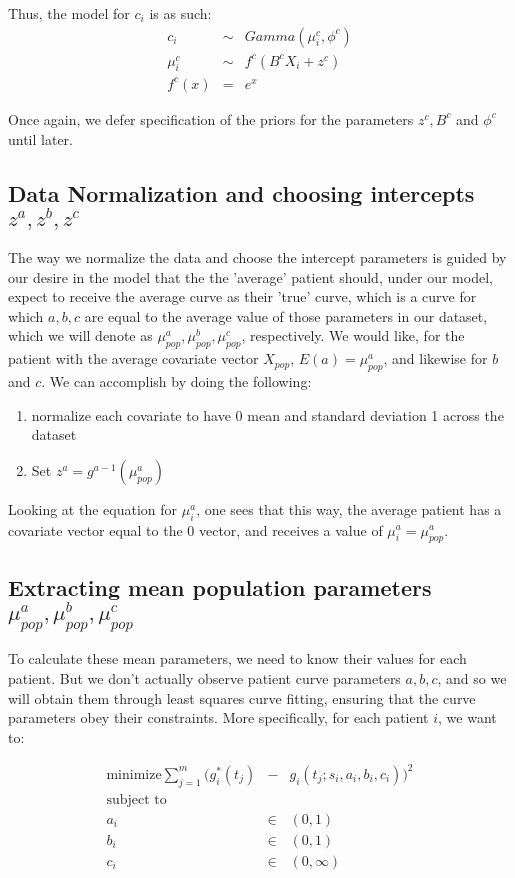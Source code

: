 Thus, the model for $c_i$ is as such:
\begin{eqnarray}
  c_i &\sim& Gamma(\mu_i^c, \phi^c) \\
  \mu_i^c &\sim& f^c(B^cX_i + z^c) \\
  f^c(x) &=& e^x
\end{eqnarray}

Once again, we defer specification of the priors for the parameters $z^c, B^c$ and $\phi^c$ until later.

\subsection{Data Normalization and choosing intercepts $z^a, z^b, z^c$}

The way we normalize the data and choose the intercept parameters is guided by our desire in the model that the the 'average' patient should, under our model, expect to receive the average curve as their 'true' curve, which is a curve for which $a,b,c$ are equal to the average value of those parameters in our dataset, which we will denote as $\mu_{pop}^a,\mu_{pop}^b,\mu_{pop}^c$, respectively.  We would like, for the patient with the average covariate vector $X_{pop}$, $E(a)=\mu_{pop}^a$, and likewise for $b$ and $c$.  We can accomplish by doing the following:
\begin{enumerate}
  \item normalize each covariate to have 0 mean and standard deviation 1 across the dataset
  \item Set $z^a = g^{a-1}(\mu_{pop}^a)$
\end{enumerate}

Looking at the equation for $\mu_i^a$, one sees that this way, the average patient has a covariate vector equal to the 0 vector, and receives a value of $\mu_i^a=\mu_{pop}^a$.

\subsection{Extracting mean population parameters $\mu_{pop}^a,\mu_{pop}^b,\mu_{pop}^c$}

To calculate these mean parameters, we need to know their values for each patient.  But we don't actually observe patient  curve parameters $a,b,c$, and so we will obtain them through least squares curve fitting, ensuring that the curve parameters obey their constraints.  More specifically, for each patient $i$, we want to:

\begin{eqnarray*}
        \textrm{minimize} \sum_{j=1}^m (g_i^*(t_j)&-&g_i(t_j;s_i,a_i,b_i,c_i))^2 \\
        \textrm{subject to} \\
        a_i &\in& (0,1) \\
        b_i &\in& (0,1) \\
        c_i &\in& (0, \infty)
\end{eqnarray*}

